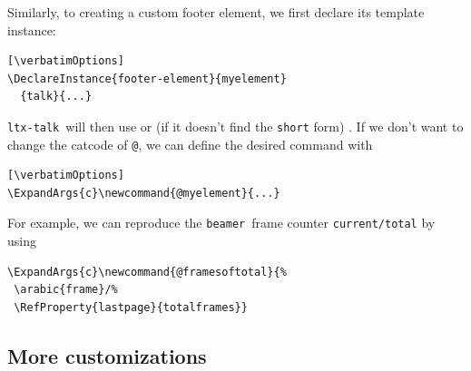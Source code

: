 \documentclass{ltugboat}
\newcommand{\verbatimOptions}{%
 \IfDocumentMetadataT{setup-code=}\small\makevmeta}
\newcommand{\beamer}{\texttt{beamer}}
\newcommand{\ltxtalk}{\texttt{ltx-talk}}
\begin{document}
Similarly, to creating a custom footer element,
we first declare its template instance:
\begin{verbatim}[\verbatimOptions]
\DeclareInstance{footer-element}{myelement}
  {talk}{...}
\end{verbatim}
\ltxtalk\ will then use  or
(if it doesn't find the \texttt{short} form) .
If we don't want to change the catcode of \texttt{@},
we can define the desired command with
\begin{verbatim}[\verbatimOptions]
\ExpandArgs{c}\newcommand{@myelement}{...}
\end{verbatim}
For example, we can reproduce the \beamer\ frame counter
\texttt{current/total} by using
\begin{lstlisting}
\ExpandArgs{c}\newcommand{@framesoftotal}{%
 \arabic{frame}/%
 \RefProperty{lastpage}{totalframes}}
\end{lstlisting}

\subsection{More customizations}
\end{document}

